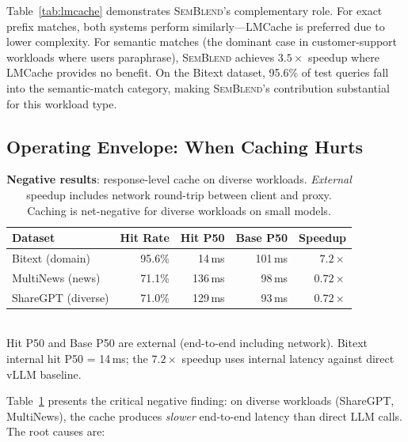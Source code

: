 \documentclass[11pt,twocolumn]{article}
\newcommand{\semblend}{\textsc{SemBlend}\xspace}
\begin{document}
Table~\ref{tab:lmcache} demonstrates \semblend's complementary role.
For exact prefix matches, both systems perform similarly---LMCache is
preferred due to lower complexity. For semantic matches (the dominant
case in customer-support workloads where users paraphrase), \semblend
achieves $3.5\times$ speedup where LMCache provides no benefit. On the
Bitext dataset, 95.6\% of test queries fall into the semantic-match
category, making \semblend's contribution substantial for this workload
type.


\subsection{Operating Envelope: When Caching Hurts}
\label{sec:negative}

\begin{table}[t]
\centering
\caption{\textbf{Negative results}: response-level cache on diverse
workloads. \emph{External} speedup includes network round-trip between
client and proxy. Caching is net-negative for diverse workloads on
small models.}
\label{tab:negative}
\footnotesize
\setlength{\tabcolsep}{2.5pt}
\begin{tabular}{@{}lrrrr@{}}
\toprule
\textbf{Dataset} & \textbf{Hit Rate} & \textbf{Hit P50} & \textbf{Base P50} & \textbf{Speedup} \\
\midrule
Bitext (domain)  & 95.6\% & 14\,ms & 101\,ms & $7.2\times$ \\
MultiNews (news) & 71.1\% & 136\,ms & 98\,ms & $0.72\times$ \\
ShareGPT (diverse) & 71.0\% & 129\,ms & 93\,ms & $0.72\times$ \\
\bottomrule
\end{tabular}\\[2pt]
{\footnotesize Hit P50 and Base P50 are external (end-to-end including
network). Bitext internal hit P50 = 14\,ms; the $7.2\times$ speedup
uses internal latency against direct vLLM baseline.}
\end{table}

Table~\ref{tab:negative} presents the critical negative finding: on
diverse workloads (ShareGPT, MultiNews), the cache produces
\emph{slower} end-to-end latency than direct LLM calls. The root
causes are:
\end{document}
